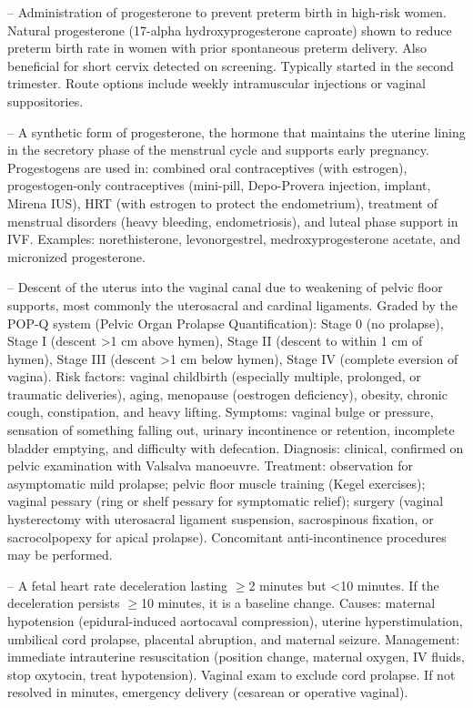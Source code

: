 -- Administration of progesterone to prevent preterm birth in high-risk women. Natural progesterone (17-alpha hydroxyprogesterone caproate) shown to reduce preterm birth rate in women with prior spontaneous preterm delivery. Also beneficial for short cervix detected on screening. Typically started in the second trimester. Route options include weekly intramuscular injections or vaginal suppositories.

-- A synthetic form of progesterone, the hormone that maintains the uterine lining in the secretory phase of the menstrual cycle and supports early pregnancy. Progestogens are used in: combined oral contraceptives (with estrogen), progestogen-only contraceptives (mini-pill, Depo-Provera injection, implant, Mirena IUS), HRT (with estrogen to protect the endometrium), treatment of menstrual disorders (heavy bleeding, endometriosis), and luteal phase support in IVF. Examples: norethisterone, levonorgestrel, medroxyprogesterone acetate, and micronized progesterone.

-- Descent of the uterus into the vaginal canal due to weakening of pelvic floor supports, most commonly the uterosacral and cardinal ligaments. Graded by the POP-Q system (Pelvic Organ Prolapse Quantification): Stage 0 (no prolapse), Stage I (descent >1 cm above hymen), Stage II (descent to within 1 cm of hymen), Stage III (descent >1 cm below hymen), Stage IV (complete eversion of vagina). Risk factors: vaginal childbirth (especially multiple, prolonged, or traumatic deliveries), aging, menopause (oestrogen deficiency), obesity, chronic cough, constipation, and heavy lifting. Symptoms: vaginal bulge or pressure, sensation of something falling out, urinary incontinence or retention, incomplete bladder emptying, and difficulty with defecation. Diagnosis: clinical, confirmed on pelvic examination with Valsalva manoeuvre. Treatment: observation for asymptomatic mild prolapse; pelvic floor muscle training (Kegel exercises); vaginal pessary (ring or shelf pessary for symptomatic relief); surgery (vaginal hysterectomy with uterosacral ligament suspension, sacrospinous fixation, or sacrocolpopexy for apical prolapse). Concomitant anti-incontinence procedures may be performed.

-- A fetal heart rate deceleration lasting \(\ge\)2 minutes but <10 minutes. If the deceleration persists \(\ge\)10 minutes, it is a baseline change. Causes: maternal hypotension (epidural-induced aortocaval compression), uterine hyperstimulation, umbilical cord prolapse, placental abruption, and maternal seizure. Management: immediate intrauterine resuscitation (position change, maternal oxygen, IV fluids, stop oxytocin, treat hypotension). Vaginal exam to exclude cord prolapse. If not resolved in minutes, emergency delivery (cesarean or operative vaginal).

